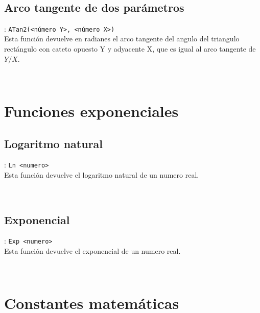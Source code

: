       \begin{fxcode}
         \\
      \end{fxcode}
      
      \subsection*{Arco tangente de dos parámetros}: \texttt{ATan2(<número Y>, <número X>)}\\
      Esta función devuelve en radianes el arco tangente del angulo del triangulo rectángulo con cateto opuesto Y y adyacente X, que es igual al arco tangente de $Y/X$.
      
      \begin{fxcode}
         \\
      \end{fxcode}
      
   \section{Funciones exponenciales}
      
      \subsection*{Logaritmo natural}: \texttt{Ln <numero>}\\
      Esta función devuelve el logaritmo natural de un numero real.
      
      \begin{fxcode}
         \\
      \end{fxcode}
      
      \subsection*{Exponencial}: \texttt{Exp <numero>}\\
      Esta función devuelve el exponencial de un numero real.
      
      \begin{fxcode}
         \\
      \end{fxcode}
      
   \section{Constantes matemáticas}
      
